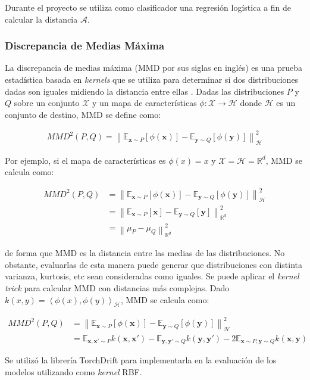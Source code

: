 Durante el proyecto se utiliza como clasificador una regresi\'on log\'istica a fin de calcular la distancia
$\mathcal{A}$.

\subsubsection{Discrepancia de Medias Máxima}

La discrepancia de medias máxima (MMD por sus siglas en inglés) es una prueba estadística basada en {\it kernels} que
se utiliza para determinar si dos distribuciones dadas son iguales midiendo la distancia entre ellas \parencite{gretton2012kernel}. Dadas las distribuciones $P$ y $Q$ sobre un conjunto $\mathcal{X}$ y un mapa de
características $\phi : \mathcal{X} \rightarrow \mathcal{H}$ donde $\mathcal{H}$ es un conjunto de destino, MMD se
define como:

\begin{align}
    MMD^2(P, Q) = \left\lVert \mathbb{E}_{\mathbf{x} \sim P}[\phi(\mathbf{x})] - \mathbb{E}_{\mathbf{y} \sim Q}[\phi(\mathbf{y})]\right\rVert_{\mathcal{H}}^2
    \label{eq:mmd}
\end{align}

Por ejemplo, si el mapa de características es $\phi(x)=x$ y $\mathcal{X}=\mathcal{H}=\mathbb{R}^d$, MMD se calcula
como:

\begin{align}
    MMD^2(P, Q) & = \left\lVert \mathbb{E}_{\mathbf{x} \sim P}[\phi(\mathbf{x})] - \mathbb{E}_{\mathbf{y} \sim Q}[\phi(\mathbf{y})] \right\rVert_{\mathcal{H}}^2 \nonumber \\
                & = \left\lVert \mathbb{E}_{\mathbf{x} \sim P}[\mathbf{x}] - \mathbb{E}_{\mathbf{y} \sim Q}[\mathbf{y}] \right\rVert_{\mathbb{R}^d}^2            \nonumber \\
                & = \left\lVert \mu_{P} - \mu_{Q} \right\rVert_{\mathbb{R}^d}^2
    \label{eq:mmd-identidad}
\end{align}

de forma que MMD es la distancia entre las medias de las distribuciones. No obstante, evaluarlas de esta manera puede
generar que distribuciones con distinta varianza, kurtosis, etc sean consideradas como iguales. Se puede aplicar el
    {\it kernel trick} para calcular MMD con distancias más complejas. Dado $k(x, y) = \left\langle \phi(x), \phi(y)
    \right\rangle_{\mathcal{H}} $, MMD se calcula como:

\begin{align}
    MMD^2(P, Q) & = \left\lVert \mathbb{E}_{\mathbf{x} \sim P}[\phi(\mathbf{x})] - \mathbb{E}_{\mathbf{y} \sim Q}[\phi(\mathbf{y})] \right\rVert_{\mathcal{H}}^2 \nonumber                                                                          \\
                & = \mathbb{E}_{\mathbf{x}, \mathbf{x'} \sim P} k(\mathbf{x}, \mathbf{x'}) - \mathbb{E}_{\mathbf{y}, \mathbf{y'} \sim Q} k(\mathbf{y}, \mathbf{y'}) - 2 \mathbb{E}_{\mathbf{x} \sim P, \mathbf{y} \sim Q} k(\mathbf{x}, \mathbf{y})
    \label{eq:mmd-kernel}
\end{align}

Se utiliz\'o la librer\'ia TorchDrift \parencite{torchdrift} para implementarla en la evaluaci\'on de los modelos utilizando como {\it kernel} RBF.